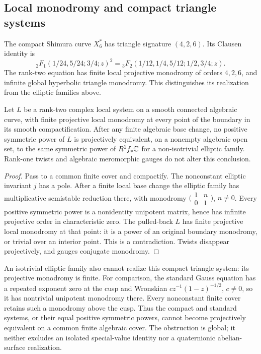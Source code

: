 \subsection{Local monodromy and compact triangle systems}
The compact Shimura curve $X_6^*$ has triangle signature $(4,2,6)$.
Its Clausen identity is
\[
 {}_2F_1(1/24,5/24;3/4;z)^2
 ={}_3F_2(1/12,1/4,5/12;1/2,3/4;z).
\]
The rank-two equation has finite local projective monodromy of orders
$4,2,6$, and infinite global hyperbolic triangle monodromy. This
distinguishes its realization from the elliptic families above.

\begin{proposition}
\label{prop:compact-monodromy-obstruction}
Let $L$ be a rank-two complex local system on a smooth connected
algebraic curve, with finite projective local monodromy at every point
of the boundary in its smooth compactification. After any finite
algebraic base change, no positive symmetric power of $L$ is
projectively equivalent, on a nonempty algebraic open set, to the same
symmetric power of $R^1f_*\mathbb C$ for a non-isotrivial elliptic family.
Rank-one twists and algebraic meromorphic gauges do not alter this
conclusion.
\end{proposition}
\begin{proof}
Pass to a common finite cover and compactify. The nonconstant elliptic
invariant $j$ has a pole. After a finite local base change the elliptic
family has multiplicative semistable reduction there, with monodromy
$\bigl(\begin{smallmatrix}1&n\\0&1\end{smallmatrix}\bigr)$,
$n\ne0$. Every positive symmetric power is a nonidentity unipotent
matrix, hence has infinite projective order in characteristic zero.
The pulled-back $L$ has finite projective local monodromy at that
point: it is a power of an original boundary monodromy, or trivial
over an interior point. This is a contradiction. Twists disappear
projectively, and gauges conjugate monodromy.
\end{proof}

An isotrivial elliptic family also cannot realize this compact triangle
system: its projective monodromy is finite. For comparison, the standard
Gauss equation has a repeated exponent zero at the cusp and Wronskian
$cz^{-1}(1-z)^{-1/2}$, $c\ne0$, so it has nontrivial unipotent
monodromy there. Every nonconstant finite cover retains such a
monodromy above the cusp. Thus the compact and standard systems, or
their equal positive symmetric powers, cannot become projectively
equivalent on a common finite algebraic cover. The obstruction is
global; it neither excludes an isolated special-value identity nor a
quaternionic abelian-surface realization.


